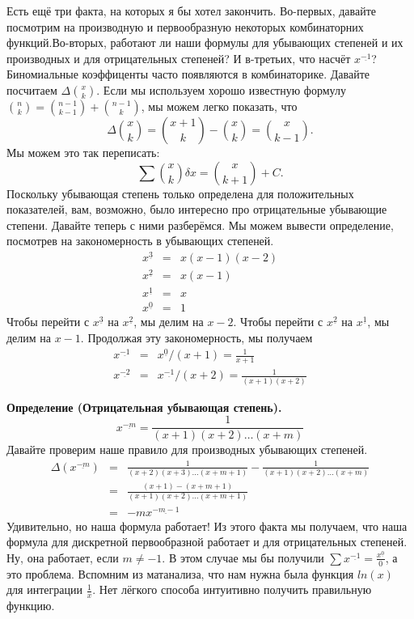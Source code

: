 \documentclass{article}
\newcommand{\ff}[1]{%
  ^{\underline{#1}}%
}
\begin{document}
Есть ещё три факта, на которых я бы хотел закончить. Во-первых, давайте посмотрим на производную и первообразную некоторых комбинаторних функций.Во-вторых, работают ли наши формулы для убывающих степеней и их производных и для отрицательных степеней? И в-третьих, что насчёт $x\ff{-1}$?
Биномиальные коэффиценты часто появляются в комбинаторике. Давайте посчитаем $\Delta \binom{x}{k}.$ Если мы используем хорошо известную формулу $\binom{n}{k}=\binom{n-1}{k-1}+\binom{n-1}{k}$, мы можем легко показать, что
$$\Delta \binom{x}{k}=\binom{x+1}{k}-\binom{x}{k}=\binom{x}{k-1}.$$
Мы можем это так переписать:
$$\sum \binom{x}{k} \delta x=\binom{x}{k+1}+C.$$
Поскольку убывающая степень только определена для положительных показателей, вам, возможно, было интересно про отрицательные убывающие степени. Давайте теперь с ними разберёмся. Мы можем вывести определение, посмотрев на закономерность в убывающих степеней.
\begin{eqnarray*}
x\ff{3} & = & x(x-1)(x-2) \\
x\ff{2} & = & x(x-1) \\
x\ff{1} & = & x \\
x\ff{0} & = & 1
\end{eqnarray*}
Чтобы перейти  с $x\ff{3}$ на $x\ff{2}$, мы делим на $x-2$. Чтобы перейти с $x\ff{2}$ на $x\ff{1}$, мы делим на $x-1$. Продолжая эту закономерность, мы получаем
\begin{eqnarray*}
x\ff{-1} & = & x\ff{0}/(x+1)=\frac{1}{x+1} \\
x\ff{-2} & = & x\ff{-1}/(x+2)=\frac{1}{(x+1)(x+2)}
\end{eqnarray*}

\textbf{Определение (Отрицательная убывающая степень).}
$$x\ff{-m}=\frac{1}{(x+1)(x+2)\dots (x+m)}$$
Давайте проверим наше правило для производных убывающих степеней.
\begin{eqnarray*}
\Delta (x\ff{-m}) & = & \frac{1}{(x+2)(x+3)\dots (x+m+1)}-\frac{1}{(x+1)(x+2)\dots (x+m)} \\
& = & \frac{(x+1)-(x+m+1)}{(x+1)(x+2)\dots (x+m+1)} \\
& = & -mx\ff{-m-1}
\end{eqnarray*}
Удивительно, но наша формула работает! Из этого факта мы получаем, что наша формула для дискретной первообразной работает и для отрицательных степеней. Ну, она работает, если $m \neq -1$. В этом случае мы бы получили $\sum x\ff{-1}=\frac{x\ff{0}}{0}$, а это проблема. Вспомним из матанализа, что нам нужна была функция $ln(x)$ для интеграции $\frac{1}{x}$. Нет лёгкого способа интуитивно получить правильную функцию.
\end{document}
